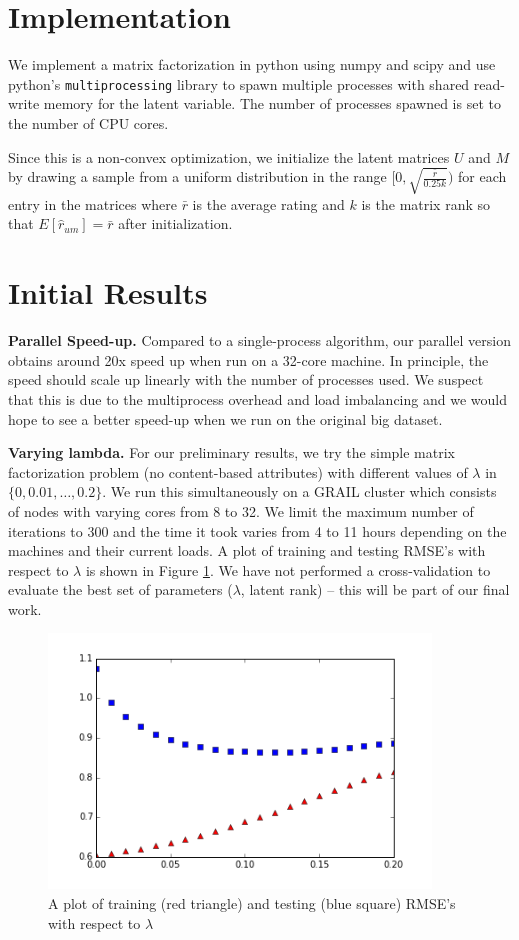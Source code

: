 \documentclass{article} %
\begin{document}
\section{Implementation}

We implement a matrix factorization in python using numpy and scipy and use python's \texttt{multiprocessing} library to spawn multiple processes with shared read-write memory for the latent variable. The number of processes spawned is set to the number of CPU cores.

Since this is a non-convex optimization, we initialize the latent matrices $U$ and $M$ by drawing a sample from a uniform distribution in the range $[0,\sqrt{\frac{\bar{r}}{0.25k}})$ for each entry in the matrices where $\bar{r}$ is the average rating and $k$ is the matrix rank so that $E[\hat{r}_{um}] = \bar{r}$ after initialization.

\section{Initial Results}

\textbf{Parallel Speed-up.}  Compared to a single-process algorithm, our
parallel version obtains around 20x speed up when run on a 32-core machine. In
principle, the speed should scale up linearly with the number of processes
used. We suspect that this is due to the multiprocess overhead and load
imbalancing and we would hope to see a better speed-up when we run on the
original big dataset.

\textbf{Varying lambda.}  For our preliminary results, we try the simple
matrix factorization problem (no content-based attributes) with different
values of $\lambda$ in $\{0, 0.01, \ldots, 0.2\}$. We run this simultaneously
on a GRAIL cluster which consists of nodes with varying cores from 8 to 32. We
limit the maximum number of iterations to 300 and the time it took varies from
4 to 11 hours depending on the machines and their current loads. A plot of
training and testing RMSE's with respect to $\lambda$ is shown in Figure
\ref{fig:rmselambda}. We have not performed a cross-validation to evaluate the
best set of parameters ($\lambda$, latent rank) -- this will be part of our
final work.


\begin{figure}[h]
\centering
\includegraphics[width=4in]{../plot.png}
\caption{\label{fig:rmselambda} A plot of
training (red triangle) and testing (blue square) RMSE's with respect to $\lambda$ }
\end{figure}
\end{document}
